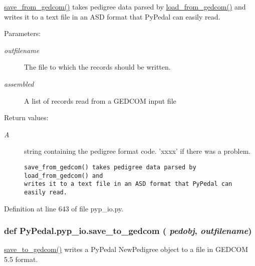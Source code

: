 \hyperlink{namespacePyPedal_1_1pyp__io_1f13533bd51ef47b9b12486ce509c0e3}{save\_\-from\_\-gedcom()} takes pedigree data parsed by \hyperlink{namespacePyPedal_1_1pyp__io_94c9bc92f204b70cb8bedd3b81b9a5bb}{load\_\-from\_\-gedcom()} and writes it to a text file in an ASD format that Py\-Pedal can easily read. 

\begin{Desc}
\item[Parameters:]
\begin{description}
\item[{\em outfilename}]The file to which the records should be written. \item[{\em assembled}]A list of records read from a GEDCOM input file \end{description}
\end{Desc}
\begin{Desc}
\item[Return values:]
\begin{description}
\item[{\em A}]string containing the pedigree format code. 'xxxx' if there was a problem.

\footnotesize\begin{verbatim}save_from_gedcom() takes pedigree data parsed by load_from_gedcom() and
writes it to a text file in an ASD format that PyPedal can easily read.
\end{verbatim}
\normalsize
 \end{description}
\end{Desc}


Definition at line 643 of file pyp\_\-io.py.\hypertarget{namespacePyPedal_1_1pyp__io_aee7ce6d9337cee600d7c3f1cd8abbc1}{
\subsubsection[save\_\-to\_\-gedcom]{\setlength{\rightskip}{0pt plus 5cm}def Py\-Pedal.pyp\_\-io.save\_\-to\_\-gedcom ( {\em pedobj},  {\em outfilename})}}
\label{namespacePyPedal_1_1pyp__io_aee7ce6d9337cee600d7c3f1cd8abbc1}


\hyperlink{namespacePyPedal_1_1pyp__io_aee7ce6d9337cee600d7c3f1cd8abbc1}{save\_\-to\_\-gedcom()} writes a Py\-Pedal New\-Pedigree object to a file in GEDCOM 5.5 format. 

